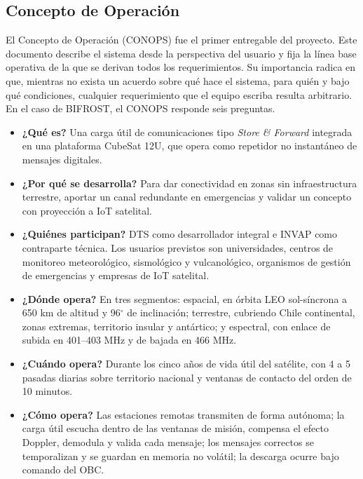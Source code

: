 \subsection{Concepto de Operación}

El Concepto de Operación (CONOPS) fue el primer entregable del proyecto. Este documento describe el sistema desde la perspectiva del usuario y fija la línea base operativa de la que se derivan todos los requerimientos. Su importancia radica en que, mientras no exista un acuerdo sobre qué hace el sistema, para quién y bajo qué condiciones, cualquier requerimiento que el equipo escriba resulta arbitrario. En el caso de BIFROST, el CONOPS responde seis preguntas.

\begin{itemize}[leftmargin=1.27cm, itemsep=2pt, topsep=4pt, parsep=0pt]
  \item \textbf{¿Qué es?} Una carga útil de comunicaciones tipo \textit{Store \& Forward} integrada en una plataforma CubeSat 12U, que opera como repetidor no instantáneo de mensajes digitales.
  \item \textbf{¿Por qué se desarrolla?} Para dar conectividad en zonas sin infraestructura terrestre, aportar un canal redundante en emergencias y validar un concepto con proyección a IoT satelital.
  \item \textbf{¿Quiénes participan?} DTS como desarrollador integral e INVAP como contraparte técnica. Los usuarios previstos son universidades, centros de monitoreo meteorológico, sismológico y vulcanológico, organismos de gestión de emergencias y empresas de IoT satelital.
  \item \textbf{¿Dónde opera?} En tres segmentos: espacial, en órbita LEO sol-síncrona a 650 km de altitud y 96$^{\circ}$ de inclinación; terrestre, cubriendo Chile continental, zonas extremas, territorio insular y antártico; y espectral, con enlace de subida en 401--403 MHz y de bajada en 466 MHz.
  \item \textbf{¿Cuándo opera?} Durante los cinco años de vida útil del satélite, con 4 a 5 pasadas diarias sobre territorio nacional y ventanas de contacto del orden de 10 minutos.
  \item \textbf{¿Cómo opera?} Las estaciones remotas transmiten de forma autónoma; la carga útil escucha dentro de las ventanas de misión, compensa el efecto Doppler, demodula y valida cada mensaje; los mensajes correctos se temporalizan y se guardan en memoria no volátil; la descarga ocurre bajo comando del OBC.
\end{itemize}


